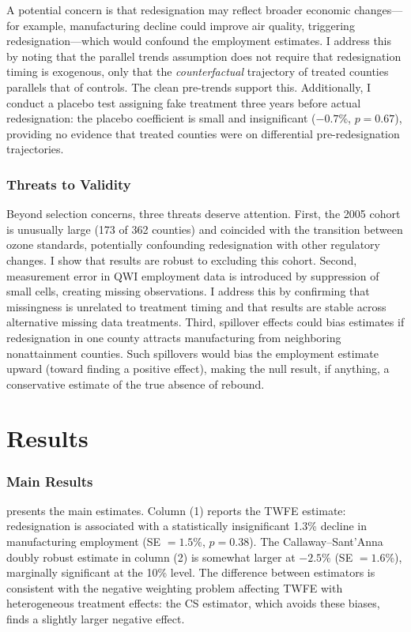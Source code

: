 \documentclass[12pt]{article}
\begin{document}
A potential concern is that redesignation may reflect broader economic changes---for example, manufacturing decline could improve air quality, triggering redesignation---which would confound the employment estimates. I address this by noting that the parallel trends assumption does not require that redesignation timing is exogenous, only that the \textit{counterfactual} trajectory of treated counties parallels that of controls. The clean pre-trends support this. Additionally, I conduct a placebo test assigning fake treatment three years before actual redesignation: the placebo coefficient is small and insignificant ($-0.7\%$, $p = 0.67$), providing no evidence that treated counties were on differential pre-redesignation trajectories.

\subsubsection*{Threats to Validity} Beyond selection concerns, three threats deserve attention. First, the 2005 cohort is unusually large (173 of 362 counties) and coincided with the transition between ozone standards, potentially confounding redesignation with other regulatory changes. I show that results are robust to excluding this cohort. Second, measurement error in QWI employment data is introduced by suppression of small cells, creating missing observations. I address this by confirming that missingness is unrelated to treatment timing and that results are stable across alternative missing data treatments. Third, spillover effects could bias estimates if redesignation in one county attracts manufacturing from neighboring nonattainment counties. Such spillovers would bias the employment estimate upward (toward finding a positive effect), making the null result, if anything, a conservative estimate of the true absence of rebound.


\section{Results}
\label{sec:results}

\subsubsection*{Main Results}  presents the main estimates. Column (1) reports the TWFE estimate: redesignation is associated with a statistically insignificant 1.3\% decline in manufacturing employment (SE $= 1.5\%$, $p = 0.38$). The Callaway--Sant'Anna doubly robust estimate in column (2) is somewhat larger at $-2.5\%$ (SE $= 1.6\%$), marginally significant at the 10\% level. The difference between estimators is consistent with the negative weighting problem affecting TWFE with heterogeneous treatment effects: the CS estimator, which avoids these biases, finds a slightly larger negative effect.
\end{document}
